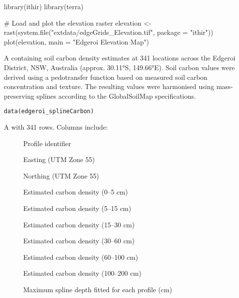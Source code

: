 \documentclass[a4paper]{book}
\begin{document}
%
\begin{Examples}
\begin{ExampleCode}
library(ithir)
library(terra)

# Load and plot the elevation raster
elevation <- rast(system.file("extdata/edgeGrids_Elevation.tif", package = "ithir"))
plot(elevation, main = "Edgeroi Elevation Map")
\end{ExampleCode}
\end{Examples}
%
\begin{Description}
A  containing soil carbon density estimates at 341 locations across the Edgeroi District, NSW, Australia (approx. 30.11°S, 149.66°E). Soil carbon values were derived using a pedotransfer function based on measured soil carbon concentration and texture. The resulting values were harmonised using mass-preserving splines according to the GlobalSoilMap specifications.
\end{Description}
%
\begin{Usage}
\begin{verbatim}
data(edgeroi_splineCarbon)
\end{verbatim}
\end{Usage}
%
\begin{Format}
A  with 341 rows. Columns include:
\begin{description}

\item[] Profile identifier
\item[] Easting (UTM Zone 55)
\item[] Northing (UTM Zone 55)
\item[] Estimated carbon density (0–5 cm)
\item[] Estimated carbon density (5–15 cm)
\item[] Estimated carbon density (15–30 cm)
\item[] Estimated carbon density (30–60 cm)
\item[] Estimated carbon density (60–100 cm)
\item[] Estimated carbon density (100–200 cm)
\item[] Maximum spline depth fitted for each profile (cm)

\end{description}

\end{Format}
\end{document}
